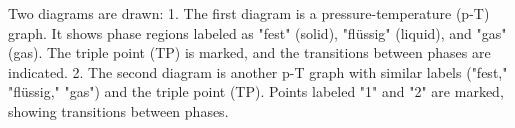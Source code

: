 Two diagrams are drawn:  
1. The first diagram is a pressure-temperature (p-T) graph. It shows phase regions labeled as "fest" (solid), "flüssig" (liquid), and "gas" (gas). The triple point (TP) is marked, and the transitions between phases are indicated.  
2. The second diagram is another p-T graph with similar labels ("fest," "flüssig," "gas") and the triple point (TP). Points labeled "1" and "2" are marked, showing transitions between phases.